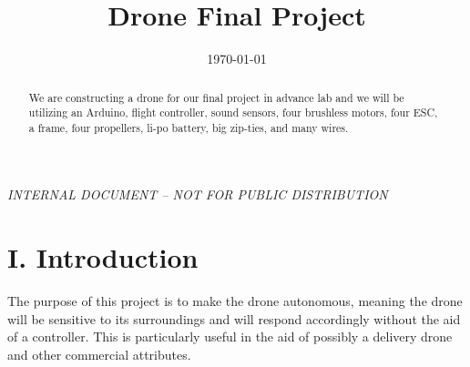 \documentclass[aps,prl,twocolumn,showpacs,superscriptaddress,groupedaddress]{revtex4}  %
\begin{document}
\widetext
{}
\bigskip
\centerline{\em INTERNAL DOCUMENT -- NOT FOR PUBLIC DISTRIBUTION}


\title{Drone Final Project}     %
\date{\today}


\begin{abstract}
We are constructing a drone for our final project in advance lab and we will be utilizing an Arduino, flight controller, sound sensors, four brushless motors, four ESC, a frame, four propellers, li-po battery, big zip-ties, and many wires.
\end{abstract}
\maketitle

\section{\label{sec: level1}I. Introduction}
The purpose of this project is to make the drone autonomous, meaning the drone will be sensitive to its surroundings and will respond accordingly without the aid of a controller. This is particularly useful in the aid of possibly a delivery drone and other commercial attributes. 
\end{document}
